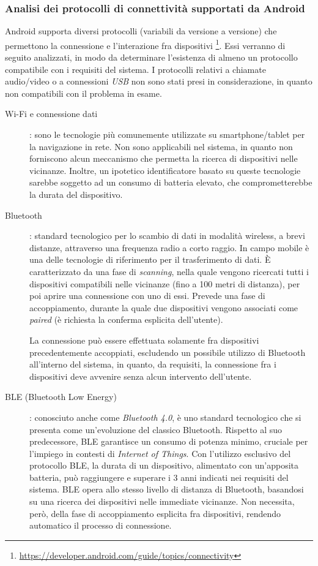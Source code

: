 \documentclass[a4paper,12pt]{report}
\begin{document}
\subsubsection{Analisi dei protocolli di connettività supportati da Android}
Android supporta diversi protocolli (variabili da versione a versione) che permettono la connessione e l'interazione fra dispositivi \footnote{\url{https://developer.android.com/guide/topics/connectivity}}. Essi verranno di seguito analizzati, in modo da determinare l'esistenza di almeno un protocollo compatibile con i requisiti del sistema. I protocolli relativi a chiamate audio/video o a connessioni \emph{USB} non sono stati presi in considerazione, in quanto non compatibili con il problema in esame.

\begin{description}
	\item[Wi-Fi e connessione dati]: sono le tecnologie più comunemente utilizzate su smartphone/tablet per la navigazione in rete. Non sono applicabili nel sistema, in quanto non forniscono alcun meccanismo che permetta la ricerca di dispositivi nelle vicinanze. Inoltre, un ipotetico identificatore basato su queste tecnologie sarebbe soggetto ad un consumo di batteria elevato, che comprometterebbe la durata del dispositivo.
	
	\item[Bluetooth]: standard tecnologico per lo scambio di dati in modalità wireless, a brevi distanze, attraverso una frequenza radio a corto raggio. In campo mobile è una delle tecnologie di riferimento per il trasferimento di dati. È caratterizzato da una fase di \emph{scanning}, nella quale vengono ricercati tutti i dispositivi compatibili nelle vicinanze (fino a 100 metri di distanza), per poi aprire una connessione con uno di essi. Prevede una fase di accoppiamento, durante la quale due dispositivi vengono associati come \emph{paired} (è richiesta la conferma esplicita dell'utente). 
	
	La connessione può essere effettuata solamente fra dispositivi precedentemente accoppiati, escludendo un possibile utilizzo di Bluetooth all'interno del sistema, in quanto, da requisiti, la connessione fra i dispositivi deve avvenire senza alcun intervento dell'utente.
	
	\item[BLE (Bluetooth Low Energy)]: conosciuto anche come \emph{Bluetooth 4.0}, è uno standard tecnologico che si presenta come un'evoluzione del classico Bluetooth. Rispetto al suo predecessore, BLE garantisce un consumo di potenza minimo, cruciale per l'impiego in contesti di \emph{Internet of Things}. Con l'utilizzo esclusivo del protocollo BLE, la durata di un dispositivo, alimentato con un'apposita batteria, può raggiungere e superare i 3 anni indicati nei requisiti del sistema. BLE opera allo stesso livello di distanza di Bluetooth, basandosi su una ricerca dei dispositivi nelle immediate vicinanze. Non necessita, però, della fase di accoppiamento esplicita fra dispositivi, rendendo automatico il processo di connessione. 
	

\end{description}
\end{document}

